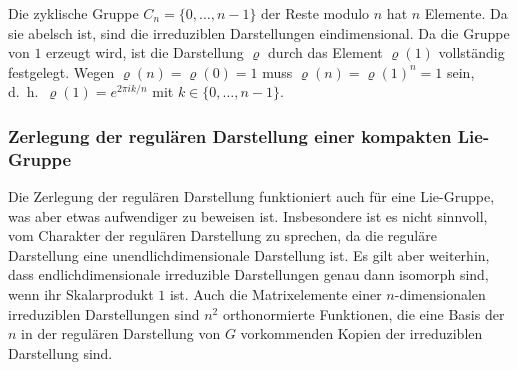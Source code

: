 \begin{beispiel}
Die zyklische Gruppe $C_n=\{0,\dots,n-1\}$ der Reste modulo $n$ hat $n$
Elemente.
Da sie abelsch ist, sind die irreduziblen Darstellungen eindimensional.
Da die Gruppe von $1$ erzeugt wird, ist die Darstellung $\varrho$ durch
das Element $\varrho(1)$ vollständig festgelegt.
Wegen $\varrho(n)=\varrho(0)=1$ muss $\varrho(n)=\varrho(1)^n =1$ sein,
d.~h.~$\varrho(1)=e^{2\pi ik/n}$ mit $k\in \{0,\dots,n-1\}$.
\end{beispiel}

%
%
\subsubsection{Zerlegung der regulären Darstellung einer kompakten Lie-Gruppe}
Die Zerlegung der regulären Darstellung funktioniert auch für eine
Lie-Gruppe, was aber etwas aufwendiger zu beweisen ist.
Insbesondere ist es nicht sinnvoll, vom Charakter der regulären Darstellung
zu sprechen, da die reguläre Darstellung eine unendlichdimensionale 
Darstellung ist.
Es gilt aber weiterhin, dass endlichdimensionale irreduzible
Darstellungen genau dann isomorph sind, wenn ihr Skalarprodukt $1$ ist.
Auch die Matrixelemente einer $n$-dimensionalen irreduziblen Darstellungen
sind $n^2$ orthonormierte Funktionen, die eine Basis der $n$ in der
regulären Darstellung von $G$ vorkommenden Kopien der irreduziblen
Darstellung sind.

\begin{beispiel}
\end{beispiel}




